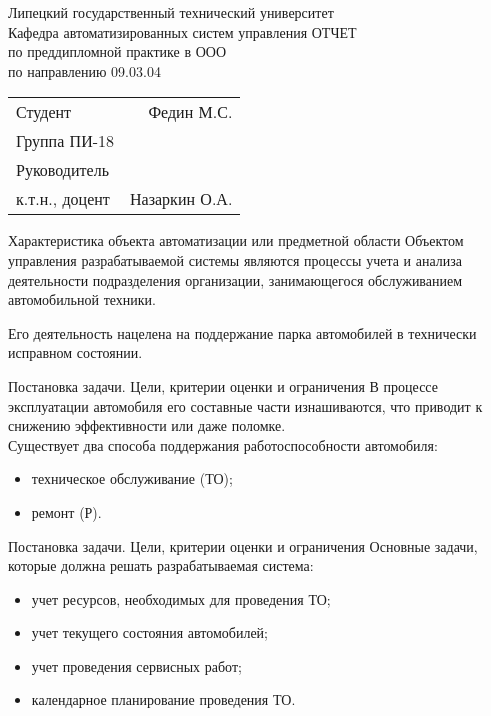 \documentclass{beamer}
\begin{document}
\begin{frame}
    \begin{center}
        Липецкий государственный технический университет\\
        Кафедра автоматизированных систем управления
        \vfill
        ОТЧЕТ\\
        по преддипломной практике в ООО \\
        по направлению 09.03.04 \\
    \end{center}
    \vfill
    \begin{tabularx}{\textwidth}{LR}
        Студент & Федин М.С. \\
        Группа ПИ-18 & \\
        Руководитель & \\
        к.т.н., доцент & Назаркин О.А.
    \end{tabularx}
\end{frame}

\begin{frame}
    {Характеристика объекта автоматизации или предметной области}
    Объектом управления разрабатываемой системы являются процессы учета и
    анализа деятельности подразделения организации, занимающегося обслуживанием
    автомобильной техники.

    Его деятельность нацелена на поддержание парка автомобилей в технически
    исправном состоянии.

\end{frame}

\begin{frame}
	{Постановка задачи. Цели, критерии оценки и ограничения}
    В процессе эксплуатации автомобиля его составные части изнашиваются, что
    приводит к снижению эффективности или даже поломке.
    \\[\baselineskip]

    Существует два способа поддержания работоспособности автомобиля:
    \begin{itemize}
        \item техническое обслуживание (ТО);
        \item ремонт (Р).
    \end{itemize}
\end{frame}

\begin{frame}
	{Постановка задачи. Цели, критерии оценки и ограничения}
Основные задачи, которые должна решать разрабатываемая система:
\begin{itemize}
	\item учет ресурсов, необходимых для проведения ТО;
	\item учет текущего состояния автомобилей;
	\item учет проведения сервисных работ;
	\item календарное планирование проведения ТО.
\end{itemize}
\end{frame}
\end{document}
